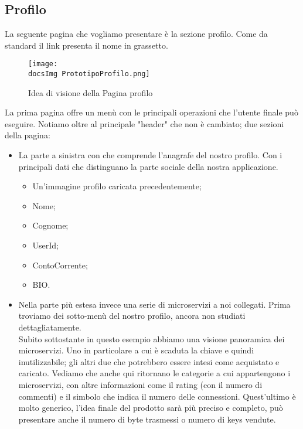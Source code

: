 {	\subsection{Profilo}{
		La seguente pagina che vogliamo presentare è la sezione profilo. Come da standard il link presenta il nome in grassetto.\\
		\begin{figure}[ht]
			\centering
			\texttt{[image: \\docsImg PrototipoProfilo.png]}
			\caption{Idea di visione della Pagina profilo}
			\label{PrototipoProfilo}
		\end{figure}
		La prima pagina offre un menù con le principali operazioni che l'utente finale può eseguire. Notiamo oltre al principale "header" che non è cambiato; due sezioni della pagina:
		\begin{itemize}
			\item La parte a sinistra con che comprende l'anagrafe del nostro profilo. Con i principali dati che distinguano la parte sociale della nostra applicazione. 
			\begin{itemize}
				\item Un'immagine profilo caricata precedentemente;
				\item Nome;
				\item Cognome;
				\item UserId;
				\item ContoCorrente;
				\item BIO.
			\end{itemize}
			\item Nella parte più estesa invece una serie di microservizi a noi collegati. Prima troviamo dei sotto-menù del nostro profilo, ancora non studiati dettagliatamente.\\
			Subito sottostante in questo esempio abbiamo una visione panoramica dei microservizi. Uno in particolare a cui è scaduta la chiave e quindi inutilizzabile; gli altri due che potrebbero essere intesi come acquistato e caricato. Vediamo che anche qui ritornano le categorie a cui appartengono i microservizi, con altre informazioni come il rating (con il numero di commenti) e il simbolo che indica il numero delle connessioni. Quest'ultimo è molto generico, l'idea finale del prodotto sarà più preciso e completo, può presentare anche il numero di byte trasmessi o numero di keys vendute. 
		\end{itemize}	
	}	
	
}
